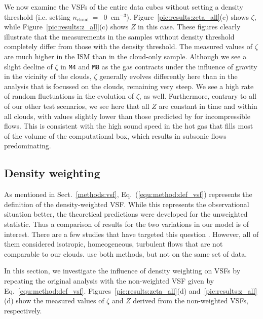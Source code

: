 \documentclass{aa}		%
\begin{document}
We now examine the VSFs of the entire data cubes without setting a density threshold (i.e. setting $n_\mathrm{cloud}~=$~0~cm$^{-3}$).  Figure~\ref{pic:results:zeta_all}(c) shows $\zeta$, while Figure~\ref{pic:results:z_all}(c) shows $Z$ in this case.
These figures clearly illustrate that the measurements in the samples without density threshold completely differ from those with the density threshold.
The measured values of $\zeta$ are much higher in the ISM than in the cloud-only sample.
Although we see a slight decline of $\zeta$ in \texttt{M4} and \texttt{M8} as the gas contracts under the influence of gravity in the vicinity of the clouds, $\zeta$ generally evolves differently here than in the analysis that is focussed on the clouds, remaining very steep.
We see a high rate of random fluctuations in the evolution of $\zeta$, as well.
Furthermore, contrary to all of our other test scenarios, we see here that all $Z$ are constant in time and within all clouds, with values slightly lower than those predicted by \citet{She1994} for incompressible flows.  
This is consistent with the high sound speed in the hot gas that fills most of the volume of the computational box, which results in subsonic flows predominating.


\subsection{Density weighting}\label{results:densweight}

As mentioned in Sect.~\ref{methods:vsf}, Eq.~(\ref{equ:method:def_vsf}) represents the definition of the density-weighted VSF.
While this represents the observational situation better, the theoretical predictions were developed for the unweighted statistic.  Thus a comparison of results for the two variations in our model is of interest.
There are a few studies that have targeted this question 
\citep[e.g.][]{Benzi1993,Schmidt2008, Benzi2010,Gotoh2002}.  
However, all of them considered isotropic, homeogeneous, turbulent flows that are not comparable to our clouds.
\citet{Padoan2016a} use both methods, but not on the same set of data. 

In this section, we investigate the influence of density weighting on VSFs by repeating the original analysis with the non-weighted VSF given by Eq.~\ref{equ:method:def_vsf}.
Figures~\ref{pic:results:zeta_all}(d) and~\ref{pic:results:z_all}(d) show the measured values of $\zeta$ and $Z$ derived from the non-weighted VSFs, respectively.
\end{document}
